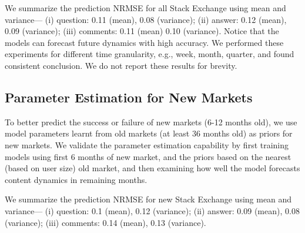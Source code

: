 We summarize the prediction NRMSE for all Stack Exchange using mean and variance--- (i) question: 0.11 (mean), 0.08 (variance); (ii) answer: 0.12 (mean), 0.09 (variance); (iii) comments: 0.11 (mean) 0.10 (variance). Notice that the models can forecast future dynamics with high accuracy. We performed these experiments for different time granularity, e.g., week, month, quarter, and found consistent conclusion. We do not report these results for brevity.

\subsection{Parameter Estimation for New Markets} 
To better predict the success or failure of new markets (6-12 months old), we use model parameters learnt from old markets (at least 36 months old) as priors for new markets. We validate the parameter estimation capability by first training models using first 6 months of new market, and the priors based on the nearest (based on user size) old market, and then examining how well the model forecasts content dynamics in remaining months. 

We summarize the prediction NRMSE for new Stack Exchange using mean and variance--- (i) question: 0.1 (mean), 0.12 (variance); (ii) answer: 0.09 (mean), 0.08 (variance); (iii) comments: 0.14 (mean), 0.13 (variance).

